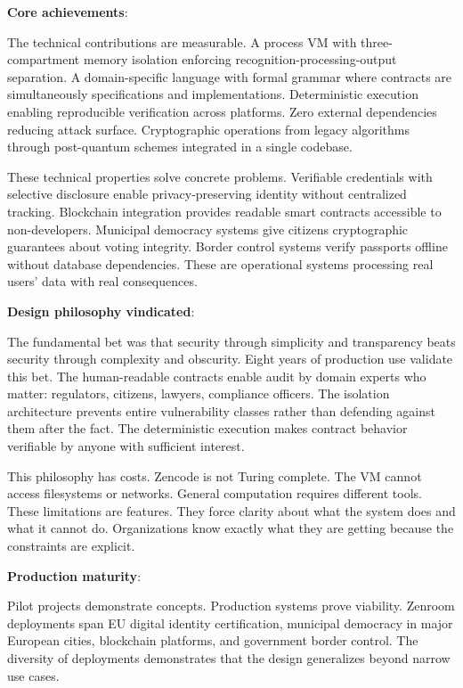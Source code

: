 \textbf{Core achievements}:

The technical contributions are measurable. A process VM with
three-compartment memory isolation enforcing
recognition-processing-output separation. A domain-specific language
with formal grammar where contracts are simultaneously specifications
and implementations. Deterministic execution enabling reproducible
verification across platforms. Zero external dependencies reducing
attack surface. Cryptographic operations from legacy algorithms
through post-quantum schemes integrated in a single codebase.

These technical properties solve concrete problems. Verifiable
credentials with selective disclosure enable privacy-preserving
identity without centralized tracking. Blockchain integration provides
readable smart contracts accessible to non-developers. Municipal
democracy systems give citizens cryptographic guarantees about voting
integrity. Border control systems verify passports offline without
database dependencies. These are operational systems processing real
users' data with real consequences.

\textbf{Design philosophy vindicated}:

The fundamental bet was that security through simplicity and
transparency beats security through complexity and obscurity. Eight
years of production use validate this bet. The human-readable
contracts enable audit by domain experts who matter: regulators,
citizens, lawyers, compliance officers. The isolation architecture
prevents entire vulnerability classes rather than defending against
them after the fact. The deterministic execution makes contract
behavior verifiable by anyone with sufficient interest.

This philosophy has costs. Zencode is not Turing complete. The VM
cannot access filesystems or networks. General computation requires
different tools. These limitations are features. They force clarity
about what the system does and what it cannot do. Organizations know
exactly what they are getting because the constraints are explicit.

\textbf{Production maturity}:

Pilot projects demonstrate concepts. Production systems prove
viability. Zenroom deployments span EU digital identity certification,
municipal democracy in major European cities, blockchain platforms,
and government border control. The diversity of deployments
demonstrates that the design generalizes beyond narrow use cases.

